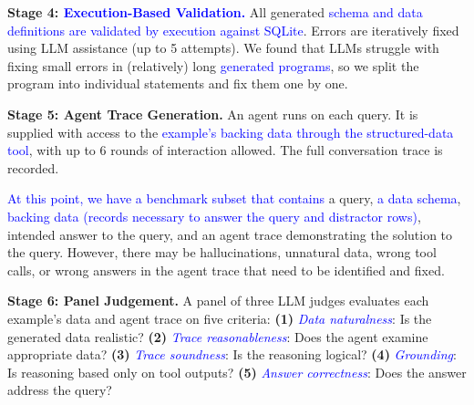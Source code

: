 \documentclass[11pt]{article}
\newcommand{\edit}[1]{\textcolor{blue}{#1}}
\newcommand{\editN}[1]{\textcolor{editgreen}{#1}}
\begin{document}
\noindent \textbf{Stage 4: \edit{Execution-Based Validation.}}
All generated \edit{schema and data definitions are validated by execution against SQLite}. Errors are iteratively fixed using LLM assistance (up to 5 attempts). We found that LLMs struggle with fixing small errors in (relatively) long \edit{generated programs}, so we split the program into individual statements and fix them one by one.

\noindent \textbf{Stage 5: Agent Trace Generation.}
An agent runs on each query. It is supplied with access to the \edit{example's backing data through the structured-data tool}, with up to 6 rounds of interaction allowed. The full conversation trace is recorded.

\edit{At this point, we have a benchmark subset that contains} a query, \edit{a data schema}, \edit{backing data (records necessary to answer the query and distractor rows)}, intended answer to the query, and  an agent trace demonstrating the solution to the query.
However, there may be hallucinations, unnatural data, wrong tool calls, or wrong answers in the agent trace that need to be identified and fixed.

\noindent \textbf{Stage 6: \editN{Panel} Judgement.}
A 
\editN{panel}
of three LLM judges evaluates each example's data and agent trace on five criteria: 
\textbf{(1)} \edit{\emph{Data naturalness}}: Is the generated data realistic?
\textbf{(2)} \edit{\emph{Trace reasonableness}}: Does the agent examine appropriate data?
\textbf{(3)} \edit{\emph{Trace soundness}}: Is the reasoning logical?
\textbf{(4)} \edit{\emph{Grounding}}: Is reasoning based only on tool outputs?
\textbf{(5)} \edit{\emph{Answer correctness}}: Does the answer address the query?



\end{document}
